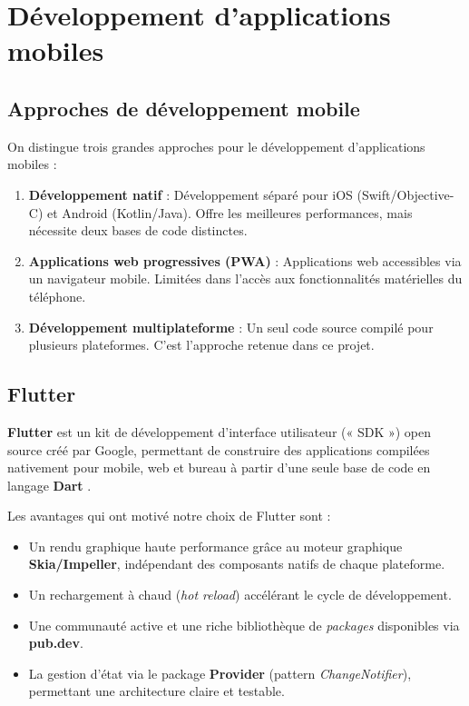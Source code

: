 \section{Développement d'applications mobiles}

\subsection{Approches de développement mobile}

On distingue trois grandes approches pour le développement d'applications mobiles \cite{flutter_book}:

\begin{enumerate}
    \item \textbf{Développement natif} : Développement séparé pour iOS (Swift/Objective-C) et Android (Kotlin/Java). Offre les meilleures performances, mais nécessite deux bases de code distinctes.
    \item \textbf{Applications web progressives (PWA)} : Applications web accessibles via un navigateur mobile. Limitées dans l'accès aux fonctionnalités matérielles du téléphone.
    \item \textbf{Développement multiplateforme} : Un seul code source compilé pour plusieurs plateformes. C'est l'approche retenue dans ce projet.
\end{enumerate}

\subsection{Flutter}

\textbf{Flutter} est un kit de développement d'interface utilisateur (« SDK ») open source créé par Google, permettant de construire des applications compilées nativement pour mobile, web et bureau à partir d'une seule base de code en langage \textbf{Dart} \cite{flutter_docs}.

Les avantages qui ont motivé notre choix de Flutter sont :

\begin{itemize}
    \item Un rendu graphique haute performance grâce au moteur graphique \textbf{Skia/Impeller}, indépendant des composants natifs de chaque plateforme.
    \item Un rechargement à chaud (\textit{hot reload}) accélérant le cycle de développement.
    \item Une communauté active et une riche bibliothèque de \textit{packages} disponibles via \textbf{pub.dev}.
    \item La gestion d'état via le package \textbf{Provider} (pattern \textit{ChangeNotifier}), permettant une architecture claire et testable.
\end{itemize}


